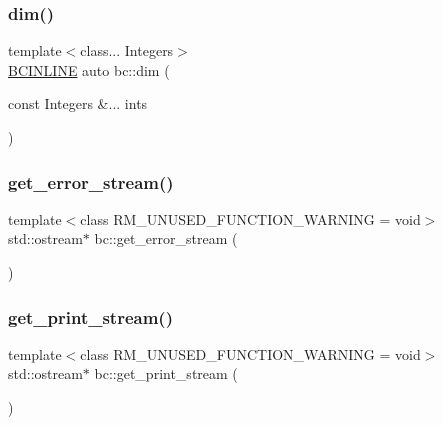 \subsubsection{\texorpdfstring{dim()}{dim()}}
{\footnotesize\ttfamily template$<$class... Integers$>$ \\
\hyperlink{common_8h_a6699e8b0449da5c0fafb878e59c1d4b1}{B\+C\+I\+N\+L\+I\+NE} auto bc\+::dim (\begin{DoxyParamCaption}\item[{const Integers \&...}]{ints }\end{DoxyParamCaption})}

\mbox{\label{namespacebc_a65f60b6b1712dcfdbd44d05873c98afe}} 
\subsubsection{\texorpdfstring{get\+\_\+error\+\_\+stream()}{get\_error\_stream()}}
{\footnotesize\ttfamily template$<$class R\+M\+\_\+\+U\+N\+U\+S\+E\+D\+\_\+\+F\+U\+N\+C\+T\+I\+O\+N\+\_\+\+W\+A\+R\+N\+I\+NG  = void$>$ \\
std\+::ostream$\ast$ bc\+::get\+\_\+error\+\_\+stream (\begin{DoxyParamCaption}{ }\end{DoxyParamCaption})\hspace{0.3cm}{\ttfamily [inline]}}

\mbox{\label{namespacebc_ad2f1d49225b5a0a25966864b54af8552}} 
\subsubsection{\texorpdfstring{get\+\_\+print\+\_\+stream()}{get\_print\_stream()}}
{\footnotesize\ttfamily template$<$class R\+M\+\_\+\+U\+N\+U\+S\+E\+D\+\_\+\+F\+U\+N\+C\+T\+I\+O\+N\+\_\+\+W\+A\+R\+N\+I\+NG  = void$>$ \\
std\+::ostream$\ast$ bc\+::get\+\_\+print\+\_\+stream (\begin{DoxyParamCaption}{ }\end{DoxyParamCaption})\hspace{0.3cm}{\ttfamily [inline]}}

